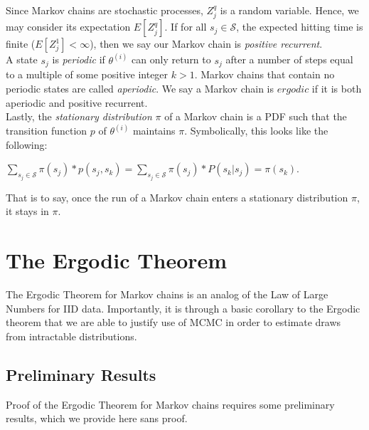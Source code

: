 \documentclass[12pt,twoside]{reedthesis}
\begin{document}
		Since Markov chains are stochastic processes, $Z^{q}_j$ is a random variable. Hence, we may consider its expectation $E[Z^{q}_j]$. If for all $s_j \in \mathcal S$, the expected hitting time is finite ($E[Z^{1}_j] < \infty$), then we say our Markov chain is {\em positive recurrent}. \\
		
		A state $s_j$ is {\em periodic} if $\theta^{(i)}$ can only return to $s_j$ after a number of steps equal to a multiple of some positive integer $k > 1$. Markov chains that contain no periodic states are called {\em aperiodic}. We say a Markov chain is $ergodic$ if it is both aperiodic and positive recurrent. \\
		
		Lastly, the {\em stationary distribution} $\pi$ of a Markov chain is a PDF such that the transition function $p$ of $\theta^{(i)}$ maintains $\pi$. Symbolically, this looks like the following:
		\begin{center}
			$\displaystyle\sum_{s_j \in \mathcal S} \pi(s_j) * p(s_j,s_k) 
			= \displaystyle\sum_{s_j \in \mathcal S} \pi(s_j) * P(s_k | s_j)
			= \pi(s_k)$.
		\end{center}
		That is to say, once the run of a Markov chain enters a stationary distribution $\pi$, it stays in $\pi$.
		
		
		\section{The Ergodic Theorem}
		The Ergodic Theorem for Markov chains is an analog of the Law of Large Numbers for IID data. Importantly, it is through a basic corollary to the Ergodic theorem that we are able to justify use of MCMC in order to estimate draws from intractable distributions.
		\subsection*{Preliminary Results}
		Proof of the Ergodic Theorem for Markov chains requires some preliminary results, which we provide here sans proof.
		
\end{document}
